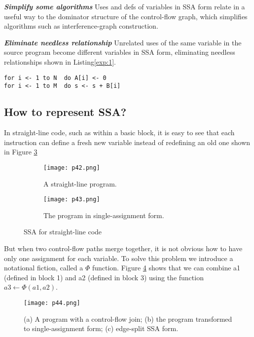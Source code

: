 \textbf{ \large \textit{Simplify some algorithms}} Uses and defs of variables in SSA form relate in a useful way to the dominator structure of the control-flow graph, which simplifies algorithms such as interference-graph construction.


\textbf{ \large \textit{Eliminate needless relationship}} Unrelated uses of the same variable in the source program become different variables in SSA form, eliminating needless relationships shown in Listing\ref{exp:1}.

\begin{lstlisting}[label={exp:1},caption={No reason why both loops should be forced to use same register to hold index
	register. SSA renames second i to a new temporary which may lead to better register
	allocation/optimization.}]
for i <- 1 to N  do A[i] <- 0
for i <- 1 to M  do s <- s + B[i]
\end{lstlisting}


\subsection{How to represent SSA?}

In straight-line code, such as within a basic block, it is easy to see that each instruction can define a fresh new 
variable instead of redefining an old one shown in Figure \ref{fig:p42-43}


\begin{figure}[htb]
	\centering
	\begin{subfigure}{0.2\textwidth}
		\centering
		\texttt{[image: p42.png]}
		\caption{A straight-line program.}
		\label{fig:p42}
	\end{subfigure}
	\begin{subfigure}{0.25\textwidth}
		\centering
		\texttt{[image: p43.png]}
		\caption{The program in single-assignment form.}
		\label{fig:p43}
	\end{subfigure}
	\caption{SSA for straight-line code}
	\label{fig:p42-43}
\end{figure}


But when two control-flow paths merge together, it is not obvious how to have only one assignment for each variable. To solve this problem we introduce a notational fiction, called a $\Phi$ function. Figure \ref{fig:p44} shows that we can combine a1 (defined in block 1) and a2 (defined in block 3) using the function $a3 \leftarrow \Phi(a1, a2)$.


\begin{figure}[H]
	\centering
	\texttt{[image: p44.png]}
	\caption{(a) A program with a control-flow join; (b) the program transformed to single-assignment form; (c) edge-split SSA form.}
	\label{fig:p44}
\end{figure}


